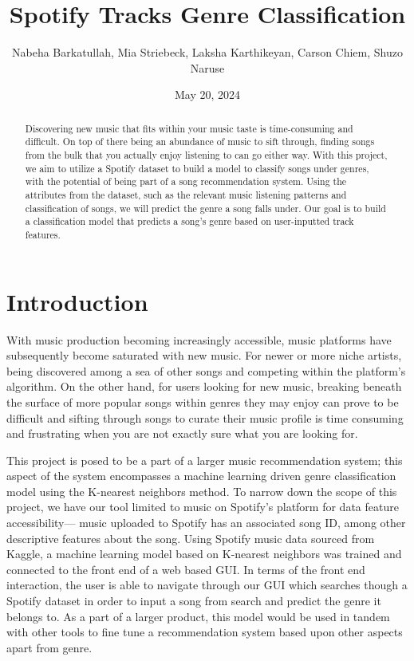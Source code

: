 \documentclass[times, twocolumn]{article}
\title{Spotify Tracks Genre Classification}
\author{Nabeha Barkatullah, Mia Striebeck, Laksha Karthikeyan, Carson Chiem, Shuzo Naruse}
\date{May 20, 2024}
\begin{document}
\maketitle

\newpage
\begin{abstract}
Discovering new music that fits within your music taste is time-consuming and difficult. On top of there being an abundance of music to sift through, finding songs from the bulk that you actually enjoy listening to can go either way. With this project, we aim to utilize a Spotify dataset to build a model to classify songs under genres, with the potential of being part of a song recommendation system. Using the attributes from the dataset, such as the relevant music listening patterns and classification of songs, we will predict the genre a song falls under. Our goal is to build a classification model that predicts a song’s genre based on user-inputted track features.
\end{abstract}
\section{Introduction}
With music production becoming increasingly accessible, music platforms have subsequently become saturated with new music. For newer or more niche artists, being discovered among a sea of other songs and competing within the platform’s algorithm. On the other hand, for users looking for new music, breaking beneath the surface of more popular songs within genres they may enjoy can prove to be difficult and sifting through songs to curate their music profile is time consuming and frustrating when you are not exactly sure what you are looking for. 

This project is posed to be a part of a larger music recommendation system; this aspect of the system encompasses a machine learning driven genre classification model using the K-nearest neighbors method. To narrow down the scope of this project, we have our tool limited to music on Spotify’s platform for data feature accessibility— music uploaded to Spotify has an associated song ID, among other descriptive features about the song. Using Spotify music data sourced from Kaggle, a machine learning model based on K-nearest neighbors was trained and connected to the front end of a web based GUI.  In terms of the front end interaction, the user is able to navigate through our GUI which searches though a Spotify dataset in order to input a song from search and predict the genre it belongs to. As a part of a larger product, this model would be used in tandem with other tools to fine tune a recommendation system based upon other aspects apart from genre. 
\end{document}
